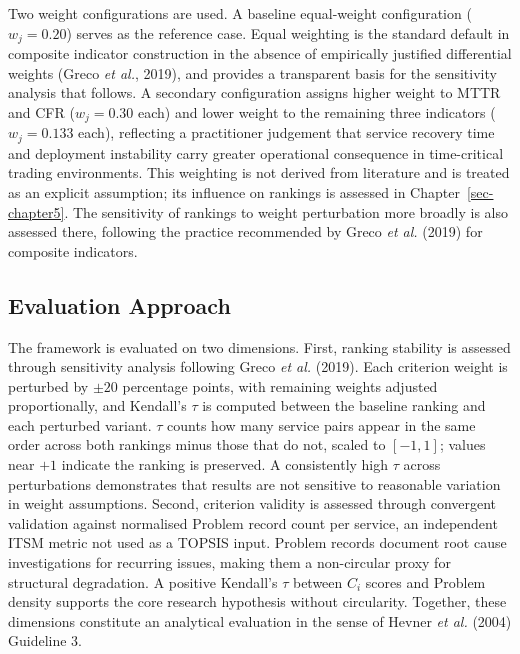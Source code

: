 \documentclass[
  12pt,
  letterpaper,
  12pt,
  oneside,
  english,
  onehalfspacing,
  headsepline]{MastersDoctoralThesis}
\begin{document}
Two weight configurations are used. A baseline equal-weight
configuration (\(w_j = 0.20\)) serves as the reference case. Equal
weighting is the standard default in composite indicator construction in
the absence of empirically justified differential weights (Greco
\emph{et al.}, 2019), and provides a transparent basis for the
sensitivity analysis that follows. A secondary configuration assigns
higher weight to MTTR and CFR (\(w_j = 0.30\) each) and lower weight to
the remaining three indicators (\(w_j = 0.133\) each), reflecting a
practitioner judgement that service recovery time and deployment
instability carry greater operational consequence in time-critical
trading environments. This weighting is not derived from literature and
is treated as an explicit assumption; its influence on rankings is
assessed in Chapter~\ref{sec-chapter5}. The sensitivity of rankings to
weight perturbation more broadly is also assessed there, following the
practice recommended by Greco \emph{et al.} (2019) for composite
indicators.

\subsection{Evaluation Approach}\label{evaluation-approach}

The framework is evaluated on two dimensions. First, ranking stability
is assessed through sensitivity analysis following Greco \emph{et al.}
(2019). Each criterion weight is perturbed by \(±20\) percentage points,
with remaining weights adjusted proportionally, and Kendall's \(\tau\)
is computed between the baseline ranking and each perturbed variant.
\(\tau\) counts how many service pairs appear in the same order across
both rankings minus those that do not, scaled to \([-1, 1]\); values
near \(+1\) indicate the ranking is preserved. A consistently high
\(\tau\) across perturbations demonstrates that results are not
sensitive to reasonable variation in weight assumptions. Second,
criterion validity is assessed through convergent validation against
normalised Problem record count per service, an independent ITSM metric
not used as a TOPSIS input. Problem records document root cause
investigations for recurring issues, making them a non-circular proxy
for structural degradation. A positive Kendall's \(\tau\) between
\(C_i\) scores and Problem density supports the core research hypothesis
without circularity. Together, these dimensions constitute an analytical
evaluation in the sense of Hevner \emph{et al.} (2004) Guideline 3.
\end{document}
